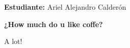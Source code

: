 \documentclass[answers]{exam} %
\begin{document}

\vspace{0.5cm}
\large\textbf{Estudiante:} Ariel Alejandro Calderón
\vspace{0.5cm}

\begin{questions}

    \question \large\textbf{¿How much do u like coffe?}
    \begin{solution}
        A lot!
    \end{solution}

    \vspace{0.5cm}

    
\end{questions}
\end{document}

